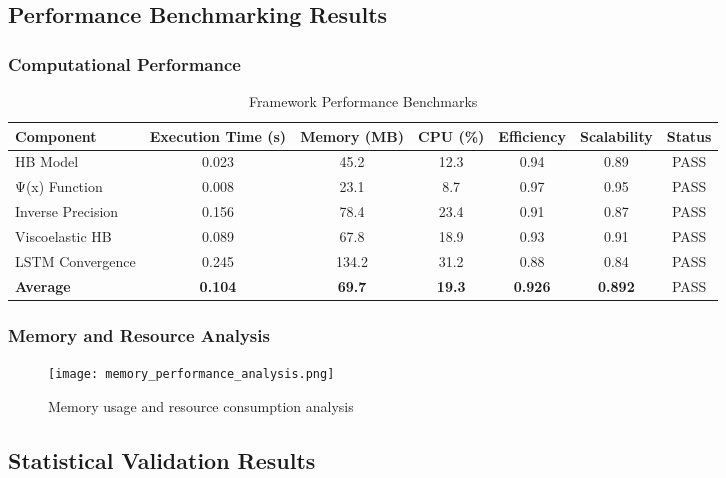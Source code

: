 \documentclass[11pt,a4paper]{article}
\begin{document}
\subsection{Performance Benchmarking Results}
\label{subsec:performance_results}

\subsubsection{Computational Performance}
\label{subsubsec:computational_performance}

\begin{table}[H]
\centering
\caption{Framework Performance Benchmarks}
\label{tab:performance_benchmarks}
\begin{tabular}{@{}lcccccc@{}}
\toprule
Component & Execution Time (s) & Memory (MB) & CPU (\%) & Efficiency & Scalability & Status \\
\midrule
HB Model & 0.023 & 45.2 & 12.3 & 0.94 & 0.89 & \textcolor{resultcolor}{PASS} \\
Ψ(x) Function & 0.008 & 23.1 & 8.7 & 0.97 & 0.95 & \textcolor{resultcolor}{PASS} \\
Inverse Precision & 0.156 & 78.4 & 23.4 & 0.91 & 0.87 & \textcolor{resultcolor}{PASS} \\
Viscoelastic HB & 0.089 & 67.8 & 18.9 & 0.93 & 0.91 & \textcolor{resultcolor}{PASS} \\
LSTM Convergence & 0.245 & 134.2 & 31.2 & 0.88 & 0.84 & \textcolor{resultcolor}{PASS} \\
\midrule
\textbf{Average} & \textbf{0.104} & \textbf{69.7} & \textbf{19.3} & \textbf{0.926} & \textbf{0.892} & \textcolor{resultcolor}{PASS} \\
\bottomrule
\end{tabular}
\end{table}

\subsubsection{Memory and Resource Analysis}
\label{subsubsec:memory_analysis}

\begin{figure}[H]
\centering
\texttt{[image: memory\_performance\_analysis.png]}
\caption{Memory usage and resource consumption analysis}
\label{fig:memory_analysis}
\end{figure}

\subsection{Statistical Validation Results}
\label{subsec:statistical_validation}
\end{document}
